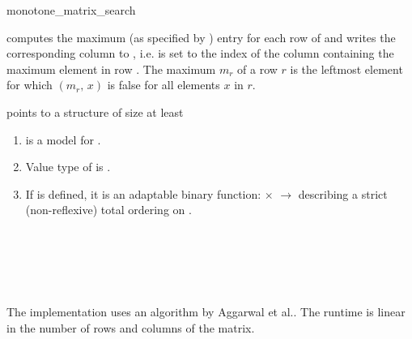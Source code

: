 \begin{ccRefFunction}{monotone_matrix_search}
\begin{ccAdvanced}
    
    computes the maximum (as specified by )
    entry for each row of  and writes the corresponding column
    to , i.e.  is set to the index of the column
    containing the maximum element in row . The maximum $m_r$
    of a row $r$ is the leftmost element for which
    $(m_r,\,x)$ is false for all elements $x$ in
    $r$.
    
    \cgalColumnLayout
    \ccPrecond {} points to a structure of size at least

    \ccRequire
    \begin{enumerate}
    \item {} is a model for
      .
    \item Value type of  is .
    \item If  is defined, it is an adaptable
      binary function:  $\times$
       $\rightarrow$  describing a strict
      (non-reflexive) total ordering on .
    \end{enumerate}
    
    \ccSeeAlso
    \\
    \\
    \\
    \\

    \ccImplementation The implementation uses an algorithm by Aggarwal
    et al.\cite{akmsw-gamsa-87}. The runtime is linear in the number
    of rows and columns of the matrix.

  \end{ccAdvanced}  
\end{ccRefFunction}

